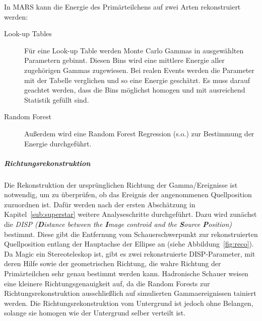 In MARS kann die Energie des Primärteilchens auf zwei Arten rekonstruiert werden:
\begin{description}
	\item[\quad Look-up Tables] Für eine Look-up Table werden Monte Carlo
		Gammas in ausgewählten Parametern gebinnt.
		Diesen Bins wird eine mittlere Energie aller
		zugehörigen Gammas zugewiesen.
		Bei realen Events werden die Parameter mit der Tabelle verglichen
		und so eine Energie geschätzt.
		Es muss darauf geachtet werden,
		dass die Bins möglichst homogen und mit ausreichend Statistik gefüllt sind.
\end{description}

\begin{description}
	\item[\quad Random Forest] Außerdem wird eine Random Forest Regression (s.o.)
		zur Bestimmung der Energie durchgeführt.
\end{description}

\subparagraph{Richtungsrekonstruktion}%
\label{par:position}

Die Rekonstruktion der ursprünglichen Richtung der Gamma\-/Ereignisse
ist notwendig, um zu überprüfen, ob das Ereignis der angenommenen
Quellposition zuzuordnen ist.
Dafür werden nach der ersten Abschätzung in Kapitel~\ref{sub:superstar} weitere
Analyseschritte durchgeführt.
Dazu wird zunächst die \textit{DISP (\textbf{D}istance between the
\textbf{I}mage controid and the \textbf{S}ource \textbf{P}osition)} bestimmt.
Diese gibt die Entfernung vom Schauerschwerpunkt zur rekonstruierten Quellposition
entlang der Hauptachse der Ellipse an (siehe Abbildung~\ref{fig:reco}).
Da Magic ein Stereoteleskop ist, gibt es zwei rekonstruierte DISP-Parameter,
mit deren Hilfe sowie der geometrischen Richtung, 
die wahre Richtung der Primärteilchen sehr genau bestimmt werden kann.
Hadronische Schauer weisen eine kleinere Richtungsgenauigkeit auf, 
da die Random Forests zur Richtungsrekonstruktion ausschließlich auf simulierten Gammaereignissen tainiert werden.
Die Richtungsrekonstruktion vom Untergrund ist jedoch ohne Belangen, solange sie
homogen wie der Untergrund selber verteilt ist.


